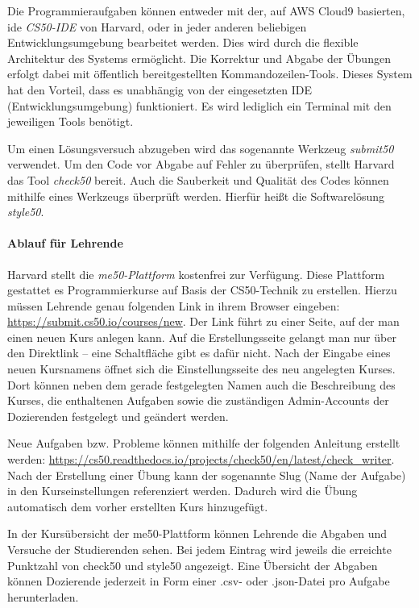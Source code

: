 Die Programmieraufgaben können entweder mit der, auf AWS Cloud9 basierten,
\ac{ide} \emph{CS50-IDE} von Harvard, oder in jeder anderen beliebigen
Entwicklungsumgebung bearbeitet werden. Dies wird durch die flexible Architektur
des Systems ermöglicht. Die Korrektur und Abgabe der Übungen erfolgt dabei mit
öffentlich bereitgestellten Kommandozeilen-Tools. Dieses System hat den Vorteil,
dass es unabhängig von der eingesetzten IDE (Entwicklungsumgebung) funktioniert.
Es wird lediglich ein Terminal mit den jeweiligen Tools benötigt.
\parencite{cs50-ide}

Um einen Lösungsversuch abzugeben wird das sogenannte Werkzeug \emph{submit50}
verwendet. Um den Code vor Abgabe auf Fehler zu überprüfen, stellt Harvard das
Tool \emph{check50} bereit. Auch die Sauberkeit und Qualität des Codes können
mithilfe eines Werkzeugs überprüft werden. Hierfür heißt die Softwarelösung
\emph{style50}. \parencite{submit50}

\paragraph{Ablauf für Lehrende}
Harvard stellt die \emph{me50-Plattform} kostenfrei zur Verfügung. Diese
Plattform gestattet es Programmierkurse auf Basis der CS50-Technik zu
erstellen. Hierzu müssen Lehrende genau folgenden Link in ihrem Browser
eingeben: \url{https://submit.cs50.io/courses/new}. Der Link führt zu einer
Seite, auf der man einen neuen Kurs anlegen kann. Auf die Erstellungsseite
gelangt man nur über den Direktlink -- eine Schaltfläche gibt es dafür nicht.
Nach der Eingabe eines neuen Kursnamens öffnet sich die Einstellungsseite des
neu angelegten Kurses. Dort können neben dem gerade festgelegten Namen auch die
Beschreibung des Kurses, die enthaltenen Aufgaben sowie die zuständigen
Admin-Accounts der Dozierenden festgelegt und geändert werden.

Neue Aufgaben bzw. Probleme können mithilfe der folgenden Anleitung erstellt
werden:
\url{https://cs50.readthedocs.io/projects/check50/en/latest/check_writer}. Nach
der Erstellung einer Übung kann der sogenannte Slug (Name der Aufgabe) in den 
Kurseinstellungen referenziert werden. Dadurch wird die Übung automatisch dem
vorher erstellten Kurs hinzugefügt.

In der Kursübersicht der me50-Plattform können Lehrende die Abgaben und Versuche
der Studierenden sehen. Bei jedem Eintrag wird jeweils die erreichte Punktzahl
von check50 und style50 angezeigt. Eine Übersicht der Abgaben können Dozierende
jederzeit in Form einer .csv- oder .json-Datei pro Aufgabe herunterladen.

